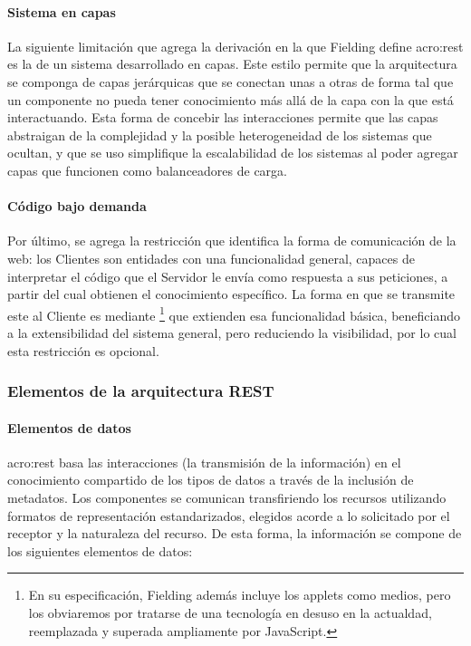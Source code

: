 \paragraph{Sistema en capas}

La siguiente limitación que agrega la derivación en la que Fielding define \gls{acro:rest} es la de un sistema desarrollado en capas. Este estilo permite que la arquitectura se componga de capas jerárquicas que se conectan unas a otras de forma tal que un componente no pueda tener conocimiento más allá de la capa con la que está interactuando. Esta forma de concebir las interacciones permite que las capas abstraigan de la complejidad y la posible heterogeneidad de los sistemas que ocultan, y que se uso simplifique la escalabilidad de los sistemas al poder agregar capas que funcionen como balanceadores de carga.


\paragraph{Código bajo demanda}

Por último, se agrega la restricción que identifica la forma de comunicación de la web: los Clientes son entidades con una funcionalidad general, capaces de interpretar el código que el Servidor le envía como respuesta a sus peticiones, a partir del cual obtienen el conocimiento específico. La forma en que se transmite este  al Cliente es mediante \footnote{En su especificación, Fielding además incluye los applets como medios, pero los obviaremos por tratarse de una tecnología en desuso en la actualdad, reemplazada y superada ampliamente por JavaScript.} que extienden esa funcionalidad básica, beneficiando a la extensibilidad del sistema general, pero reduciendo la visibilidad, por lo cual esta restricción es opcional.


\subsubsection{Elementos de la arquitectura REST}
\label{standard:rest:elementos}

\paragraph{Elementos de datos}

\gls{acro:rest} basa las interacciones (la transmisión de la información) en el conocimiento compartido de los tipos de datos a través de la inclusión de metadatos. Los componentes se comunican transfiriendo los recursos utilizando formatos de representación estandarizados, elegidos acorde a lo solicitado por el receptor y la naturaleza del recurso. De esta forma, la información se compone de los siguientes elementos de datos:

